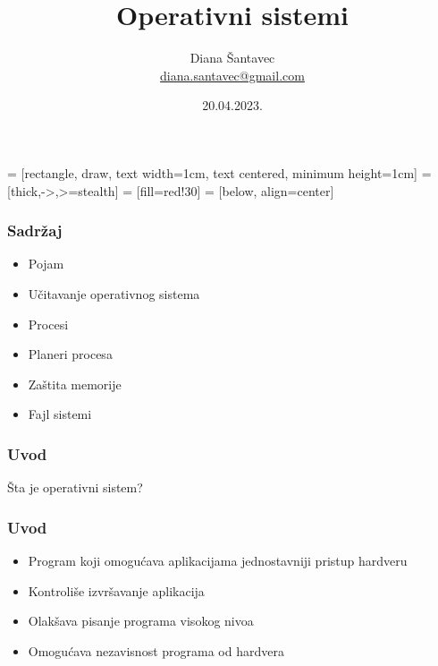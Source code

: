 \documentclass{beamer}
\title{Operativni sistemi}
\author[Diana Šantavec]{Diana Šantavec \\ \small \url{diana.santavec@gmail.com}}
\institute{Istraživačka stanica Petnica}
\date{20.04.2023.}
\begin{document}

 = [rectangle, draw, text width=1cm, text centered, minimum height=1cm]
 = [thick,->,>=stealth]
 = [fill=red!30]
 = [below, align=center]

\frame{\titlepage}


\begin{frame}
\frametitle{Sadržaj}
\begin{itemize}
    \item Pojam \newline
    \item Učitavanje operativnog sistema \newline
    \item Procesi \newline
    \item Planeri procesa \newline
    \item Zaštita memorije \newline
    \item Fajl sistemi
\end{itemize}
\end{frame}

\begin{frame}
    \frametitle{Uvod}
    \begin{center}
        \large{Šta je operativni sistem?}
    \end{center}
\end{frame}


\begin{frame}
    \frametitle{Uvod}
    \begin{itemize}
        \item Program koji omogućava aplikacijama jednostavniji pristup hardveru \newline
        \item Kontroliše izvršavanje aplikacija \newline
        \item Olakšava pisanje programa visokog nivoa \newline
        \item Omogućava nezavisnost programa od hardvera \newline
    \end{itemize}
\end{frame}
\end{document}

